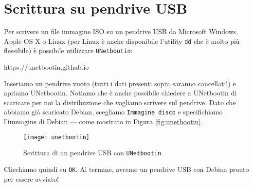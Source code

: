 \section{Scrittura su pendrive USB}
Per scrivere un file immagine ISO su un pendrive USB da Microsoft Windows, Apple OS X o Linux (per Linux è anche disponibile l'utility \texttt{dd} che è molto più flessibile) è possibile utilizzare \texttt{UNetbootin}:

\begin{graybox}
	https://unetbootin.github.io
\end{graybox}

Inseriamo un pendrive vuoto (tutti i dati presenti sopra saranno cancellati!) e apriamo UNetbootin. Notiamo che è anche possibile chiedere a UNetbootin di scaricare per noi la distribuzione che vogliamo scrivere sul pendrive. Dato che abbiamo già scaricato Debian, scegliamo \texttt{Immagine disco} e specifichiamo l'immagine di Debian --- come mostrato in Figura \vref{fig:unetbootin}.

\begin{figure}[ht]
	\centering
	\texttt{[image: unetbootin]}
	\caption{Scrittura di un pendrive USB con \texttt{UNetbootin}}
	\label{fig:unetbootin}
\end{figure}

Clicchiamo quindi su \texttt{OK}. Al termine, avremo un pendrive USB con Debian pronto per essere avviato!
